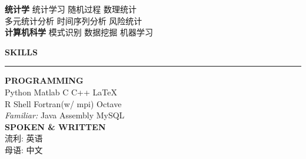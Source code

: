\documentclass[UTF8,A4]{ctexart}
\newcommand{\cvsection}[1]
{
	\begin{center}
		\large\textcolor{sectcol}{\textbf{#1}}
	\end{center}
}
\begin{document}
\textbf{统计学}
统计学习 \textbullet{} 随机过程 \textbullet{} 数理统计 \\
多元统计分析 \textbullet{} 时间序列分析 \textbullet{} 风险统计\\

\textbf{计算机科学}
模式识别 \textbullet{} 数据挖掘 \textbullet{} 机器学习\\


\cvsection{SKILLS}
\vspace{-18pt}
\textcolor{softcol}{\hrule}
\vspace{6pt}

\textbf{PROGRAMMING}\\
Python \textbullet{} Matlab \textbullet{} C \textbullet{} C++ \textbullet{} \LaTeX\ \\
R \textbullet{} Shell \textbullet{} Fortran(w/ mpi) \textbullet{} Octave\\
\textit{Familiar:}
Java \textbullet{} Assembly \textbullet{} MySQL\\

\textbf{SPOKEN \& WRITTEN}\\
流利: 英语 \\
母语: 中文\\
\end{document}
